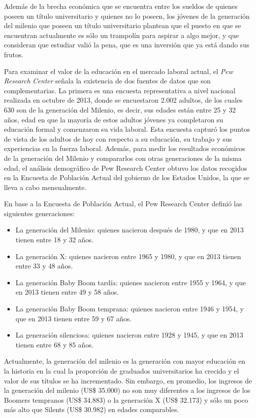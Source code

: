Además de la brecha económica que se encuentra entre los sueldos de quienes poseen un título universitario y quienes no lo poseen, los jóvenes de la generación del milenio que poseen un título universitario plantean que el puesto en que se encuentran actualmente es sólo un trampolín para aspirar a algo mejor, y que consideran que estudiar valió la pena, que es una inversión que ya está dando sus frutos. 

Para examinar el valor de la educación en el mercado laboral actual, el \textit{Pew Research Center} señala la existencia de dos fuentes de datos que son complementarias. La primera es una encuesta representativa a nivel nacional realizada en octubre de 2013, donde se encuestaron 2.002 adultos, de los cuales 630 son de la generación del Milenio, es decir, sus edades están entre 25 y 32 años, edad en que la mayoría de estos adultos jóvenes ya completaron su educación formal y comenzaron su vida laboral. Esta encuesta capturó los puntos de vista de los adultos de hoy con respecto a su educación, su trabajo y sus experiencias en la fuerza laboral.
Además, para medir los resultados económicos de la generación del Milenio y compararlos con otras generaciones de la misma edad, el análisis demográfico de Pew Research Center obtuvo los datos recogidos en la Encuesta de Población Actual del gobierno de los Estados Unidos, la que se lleva a cabo mensualmente. 

En base a la Encuesta de Población Actual, el Pew Research Center definió las siguientes generaciones:
\begin{itemize}
\item La generación del Milenio: quienes nacieron después de 1980, y que en 2013 tienen entre 18 y 32 años.
\item La generación X: quienes nacieron entre 1965 y 1980, y que en 2013 tienen entre 33 y 48 años.
\item La generación Baby Boom tardía: quienes nacieron entre 1955 y 1964, y que en 2013 tienen entre 49 y 58 años.
\item La generación Baby Boom temprana: quienes nacieron entre 1946 y 1954, y que en 2013 tienen entre 59 y 67 años.
\item La generación silenciosa: quienes nacieron entre 1928 y 1945, y que en 2013 tienen entre 68 y 85 años.
\end{itemize}

Actualmente, la generación del milenio es la generación con mayor educación en la historia en la cual la proporción de graduados universitarios ha crecido y el valor de sus títulos se ha incrementado. Sin embargo, en promedio, los ingresos de la generación del milenio (US\$ 35.000) no son muy diferentes a los ingresos de los Boomers tempranos (US\$ 34.883) o la generación X (US\$ 32.173) y sólo un poco más alto que Silents (US\$ 30.982) en edades comparables.

